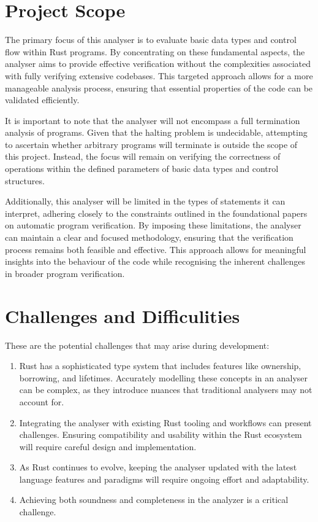\documentclass[11pt,a4paper]{article}
\begin{document}
\pagebreak
\section{Project Scope}
The primary focus of this analyser is to evaluate basic data types and control flow
within Rust programs. By concentrating on these fundamental aspects, the analyser aims
to provide effective verification without the complexities associated with fully 
verifying extensive codebases. This targeted approach allows for a more manageable 
analysis process, ensuring that essential properties of the code can be validated 
efficiently.

It is important to note that the analyser will not encompass a full termination 
analysis of programs. Given that the halting problem is undecidable, attempting to 
ascertain whether arbitrary programs will terminate is outside the scope of this 
project. Instead, the focus will remain on verifying the correctness of operations 
within the defined parameters of basic data types and control structures.

Additionally, this analyser will be limited in the types of statements it can 
interpret, adhering closely to the constraints outlined in the foundational papers 
on automatic program verification. By imposing these limitations, the analyser can 
maintain a clear and focused methodology, ensuring that the verification process 
remains both feasible and effective. This approach allows for meaningful insights 
into the behaviour of the code while recognising the inherent challenges in broader 
program verification.

\pagebreak
\section{Challenges and Difficulities}
These are the potential challenges that may arise during development:
\begin{enumerate}
    \item Rust has a sophisticated type system that includes features like ownership,
          borrowing, and lifetimes. Accurately modelling these concepts in an analyser can be 
          complex, as they introduce nuances that traditional analysers may not 
          account for.
    \item Integrating the analyser with existing Rust tooling and workflows can
          present challenges. Ensuring compatibility and usability within the Rust 
          ecosystem will require careful design and implementation.
    \item As Rust continues to evolve, keeping the analyser updated with the latest
          language features and paradigms will require ongoing effort and adaptability.
    \item Achieving both soundness and completeness in the analyzer is a critical
          challenge.
\end{enumerate}
\end{document}
